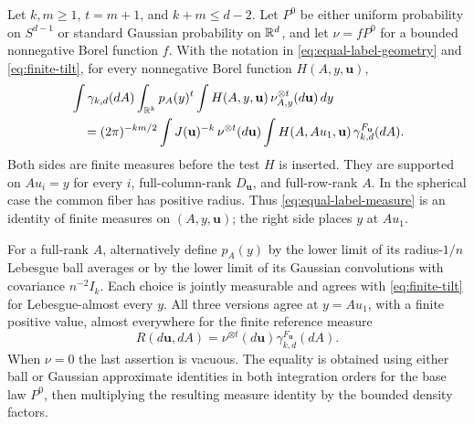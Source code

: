 \begin{theorem}
\label{thm:equal-label-measure}
Let $k,m\ge1$, $t=m+1$, and $k+m\le d-2$. Let $P^0$ be either uniform
probability on $S^{d-1}$ or standard Gaussian probability on $\mathbb R^d$,
and let $\nu=fP^0$ for a bounded nonnegative Borel function $f$.
With the notation in \eqref{eq:equal-label-geometry} and
\eqref{eq:finite-tilt}, for every nonnegative Borel function
$H(A,y,\mathbf u)$,
\begin{align}
 &\int\gamma_{k,d}(dA)\int_{\mathbb R^k}p_A(y)^t
       \int H(A,y,\mathbf u)\,\nu_{A,y}^{\otimes t}(d\mathbf u)\,dy
 \notag\\
 &\quad=(2\pi)^{-km/2}\int J(\mathbf u)^{-k}\,\nu^{\otimes t}(d\mathbf u)
       \int H(A,Au_1,\mathbf u)\,\gamma_{k,d}^{F_{\mathbf u}}(dA).
 \label{eq:equal-label-measure}
\end{align}
Both sides are finite measures before the test $H$ is inserted. They are
supported on $Au_i=y$ for every $i$, full-column-rank $D_{\mathbf u}$,
and full-row-rank $A$. In the spherical case the common fiber has positive
radius. Thus \eqref{eq:equal-label-measure} is an identity of finite measures
on $(A,y,\mathbf u)$; the right side places $y$ at $Au_1$.

For a full-rank $A$, alternatively define $p_A(y)$ by the lower limit of
its radius-$1/n$ Lebesgue ball averages or by the lower limit of its Gaussian
convolutions with covariance $n^{-2}I_k$. Each choice is jointly measurable
and agrees with \eqref{eq:finite-tilt} for Lebesgue-almost every $y$.
All three versions agree at $y=Au_1$, with a finite positive value, almost
everywhere for the finite reference measure
\begin{equation}\label{eq:equal-label-reference}
 R(d\mathbf u,dA)=\nu^{\otimes t}(d\mathbf u)
                 \gamma_{k,d}^{F_{\mathbf u}}(dA).
\end{equation}
When $\nu=0$ the last assertion is vacuous. The equality is obtained using
either ball or Gaussian approximate identities in both integration orders
for the base law $P^0$, then multiplying the resulting measure identity by
the bounded density factors.
\end{theorem}

